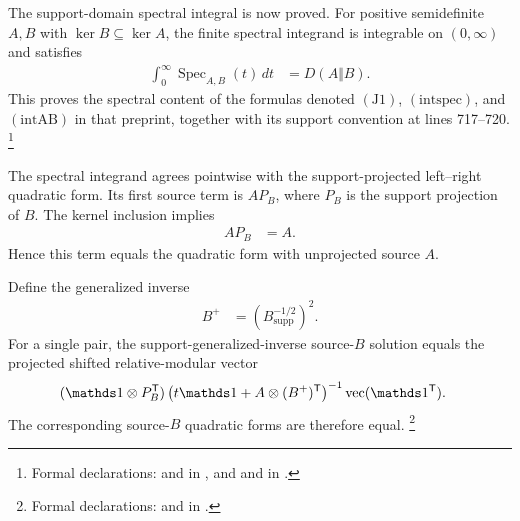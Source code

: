 \documentclass[11pt]{article}
\begin{document}
The support-domain spectral integral is now proved. For positive semidefinite
$A,B$ with $\ker B\subseteq\ker A$, the finite spectral integrand is
integrable on $(0,\infty)$ and satisfies
\begin{align}
    \int_0^\infty
        \operatorname{Spec}_{A,B}(t)\,dt
        &=D(A\Vert B).
    \label{eq:cpsv16_ssa_equality_hayashi_markov_support_spectral_integral}
\end{align}
This proves the spectral content of the formulas denoted
$(\mathrm{J1})$, $(\mathrm{intspec})$, and $(\mathrm{intAB})$ in that
preprint, together with its support convention at lines 717--720.%
\footnote{Formal declarations:
 and
in , and
 and
in .}

The spectral integrand agrees pointwise with the support-projected left--right
quadratic form. Its first source term is $AP_B$, where $P_B$ is the support
projection of $B$. The kernel inclusion implies
\begin{align}
    AP_B
        &=A.
    \label{eq:cpsv16_ssa_equality_hayashi_markov_source_support_absorption}
\end{align}
Hence this term equals the quadratic form with unprojected source $A$.

Define the generalized inverse
\begin{align}
    B^+
        &=\left(B^{-1/2}_{\mathrm{supp}}\right)^2.
    \label{eq:cpsv16_ssa_equality_hayashi_markov_reference_generalized_inverse}
\end{align}
For a single pair, the support-generalized-inverse source-$B$ solution equals
the projected shifted relative-modular vector
\begin{align}
    &(\Id\otimes P_B^{\mathsf T})
    \left(t\Id+A\otimes(B^+)^{\mathsf T}\right)^{-1}
    \operatorname{vec}(\Id^{\mathsf T}).
    \label{eq:cpsv16_ssa_equality_hayashi_markov_projected_modular_vector}
\end{align}
The corresponding source-$B$ quadratic forms are therefore equal.%
\footnote{Formal declarations:
and
 in
.}
\end{document}
